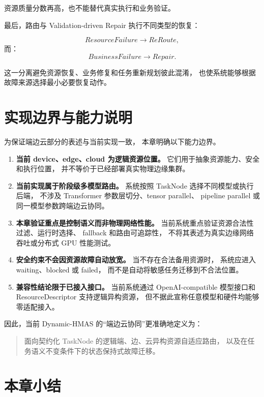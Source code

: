 \documentclass[UTF8,a4paper,12pt,oneside]{ctexbook}
\begin{document}
资源质量分数再高，也不能替代真实执行和业务验证。

最后，路由与 Validation-driven Repair 执行不同类型的恢复：

\[
ResourceFailure
\rightarrow
ReRoute,
\]
而：
\[
BusinessFailure
\rightarrow
Repair.
\]

这一分离避免资源恢复、业务修复和任务重新规划彼此混淆，
也使系统能够根据故障来源选择最小必要恢复动作。


\section{实现边界与能力说明}

为保证端边云部分的表述与当前实现一致，
本章明确以下能力边界。

\begin{enumerate}
    \item \textbf{当前 device、edge、cloud 为逻辑资源位置。}
    它们用于抽象资源能力、安全和执行位置，
    并不等价于已经部署真实物理边缘集群。

    \item \textbf{当前实现属于阶段级多模型路由。}
    系统按照 TaskNode 选择不同模型或执行后端，
    不涉及 Transformer 参数层切分、tensor parallel、
    pipeline parallel 或同一模型参数跨端边云协同。

    \item \textbf{本章验证重点是控制语义而非物理网络性能。}
    当前系统重点验证资源合法性过滤、运行时选择、
    fallback 和路由可追踪性，
    不将其表述为真实边缘网络吞吐或分布式 GPU 性能测试。

    \item \textbf{安全约束不会因资源故障自动放宽。}
    当不存在合法备用资源时，
    系统应进入 waiting、blocked 或 failed，
    而不是自动将敏感任务迁移到不合法位置。

    \item \textbf{兼容性结论限于已接入接口。}
    当前系统通过 OpenAI-compatible 模型接口和
    ResourceDescriptor 支持逻辑异构资源，
    但不据此宣称任意模型和硬件均能够零适配接入。
\end{enumerate}

因此，当前 Dynamic-HMAS 的“端边云协同”更准确地定义为：

\begin{quote}
面向契约化 TaskNode 的逻辑端、边、云异构资源自适应路由，
以及在任务语义不变条件下的状态保持式故障迁移。
\end{quote}


\section{本章小结}
\end{document}
